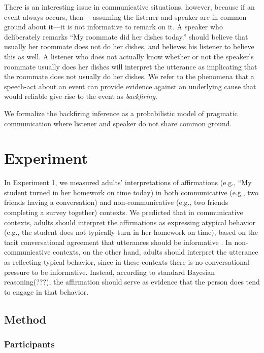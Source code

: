 \documentclass[10pt,letterpaper]{article}
\begin{document}
There is an interesting issue in communicative situations, however, because if an event always occurs, then----assuming the listener and speaker are in common ground about it---it is not informative to remark on it. 
A speaker who deliberately remarks ``My roommate did her dishes today.'' should believe that usually her roommate does not do her dishes, and believes his listener to believe this as well. 
A listener who does not actually know whether or not the speaker's roommate usually does her dishes will interpret the utterance as implicating that the roommate does not usually do her dishes.
We refer to the phenomena that a speech-act about an event can provide evidence against an underlying cause that would reliable give rise to the event as \emph{backfiring}. 

We formalize the backfiring inference as a probabilistic model of pragmatic communication where listener and speaker do not share common ground. 




\section{Experiment}

	In Experiment 1, we measured adults’ interpretations of affirmations (e.g., “My student turned in her homework on time today) in both communicative (e.g., two friends having a conversation) and non-communicative (e.g., two friends completing a survey together) contexts.  We predicted that in communicative contexts, adults should interpret the affirmations as expressing atypical behavior (e.g., the student does not typically turn in her homework on time), based on the tacit conversational agreement that utterances should be informative \cite{Grice1975}.  In non-communicative contexts, on the other hand, adults should interpret the utterance as reflecting typical behavior, since in these contexts there is no conversational pressure to be informative.  Instead, according to standard Bayesian reasoning(???), the affirmation should serve as evidence that the person does tend to engage in that behavior.

\subsection{Method}

\subsubsection{Participants}
\end{document}
